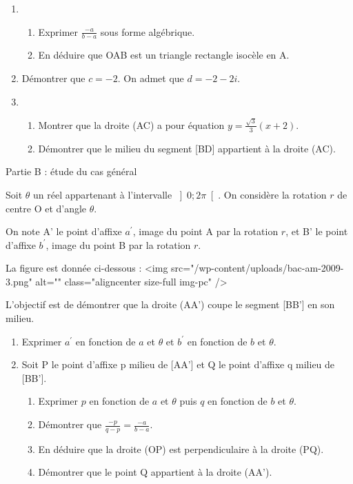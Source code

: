 \begin{center}
\end{center}
\begin{enumerate}
     \item
     \begin{enumerate}[label=\alph*.]
          \item
          Exprimer $\frac{- a}{b-a}$ sous forme algébrique.
          \item
          En déduire que OAB est un triangle rectangle isocèle en A.
     \end{enumerate}
     \item
     Démontrer que $c=-2$. On admet que $d=-2-2i$.
     \item
     \begin{enumerate}[label=\alph*.]
          \item
          Montrer que la droite (AC) a pour équation $y=\frac{\sqrt{3}}{3}\left(x+ 2\right)$.
          \item
          Démontrer que le milieu du segment [BD] appartient à la droite (AC).
     \end{enumerate}
\end{enumerate}
\begin{h3}Partie B : étude du cas général\end{h3}
Soit $\theta $ un réel appartenant à l'intervalle $\left]0; 2\pi \right[$. On considère la rotation $r$ de centre O et d'angle $\theta $.
\par
On note A' le point d'affixe $a^{\prime}$, image du point A par la rotation $r$, et B' le point d'affixe $b^{\prime}$, image du point B par la rotation $r$.
\par
La figure est donnée ci-dessous :
<img src="/wp-content/uploads/bac-am-2009-3.png" alt="" class="aligncenter size-full  img-pc" />
\begin{center}
\end{center}
L'objectif est de démontrer que la droite (AA') coupe le segment [BB'] en son milieu.
\begin{enumerate}
     \item
     Exprimer $a^{\prime}$ en fonction de $a$ et $\theta $ et $b^{\prime}$ en fonction de $b$ et $\theta $.
     \item
     Soit P le point d'affixe p milieu de [AA'] et Q le point d'affixe q milieu de [BB'].
     \begin{enumerate}[label=\alph*.]
          \item
          Exprimer $p$ en fonction de $a$ et $\theta $ puis $q$ en fonction de $b$ et $\theta $.
          \item
          Démontrer que $\frac{-p}{q-p}=\frac{- a}{b-a}$.
          \item
          En déduire que la droite (OP) est perpendiculaire à la droite (PQ).
          \item
          Démontrer que le point Q appartient à la droite (AA').
     \end{enumerate}
\end{enumerate}
